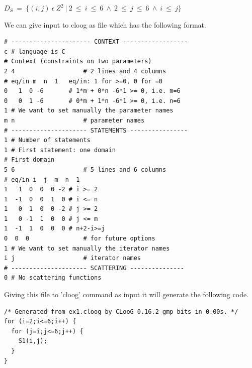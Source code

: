 \documentclass[MTech]{iitmdiss}
\begin{document}
\begin{center}
$D_{S}\ =\ \{(i,j)\ \epsilon\ Z^2\ |\ 2\ \leq\ i\ \leq\ 6\ \wedge\ 2\ \leq\ j\ \leq\ 6\ \wedge\ i\ \leq\ j\}$
\end{center}
We can give input to cloog as file which has the following format.
{\footnotesize
\begin{lstlisting}
# ---------------------- CONTEXT ------------------
c # language is C
# Context (constraints on two parameters)
2 4                   # 2 lines and 4 columns
# eq/in m  n  1   eq/in: 1 for >=0, 0 for =0
0   1  0 -6       # 1*m + 0*n -6*1 >= 0, i.e. m=6
0   0  1 -6       # 0*m + 1*n -6*1 >= 0, i.e. n=6
1 # We want to set manually the parameter names
m n                   # parameter names
# --------------------- STATEMENTS ----------------
1 # Number of statements
1 # First statement: one domain
# First domain
5 6                   # 5 lines and 6 columns
# eq/in i  j  m  n  1
1   1  0  0  0 -2 # i >= 2
1  -1  0  0  1  0 # i <= n
1   0  1  0  0 -2 # j >= 2
1   0 -1  1  0  0 # j <= m
1  -1  1  0  0  0 # n+2-i>=j
0  0  0               # for future options
1 # We want to set manually the iterator names
i j                   # iterator names
# --------------------- SCATTERING ---------------
0 # No scattering functions
\end{lstlisting}
}
Giving this file to 'cloog' command  as input it will generate the following code.
{\footnotesize
\begin{lstlisting}
/* Generated from ex1.cloog by CLooG 0.16.2 gmp bits in 0.00s. */
for (i=2;i<=6;i++) {
  for (j=i;j<=6;j++) {
    S1(i,j);
  }
}
\end{lstlisting}
}
\end{document}
